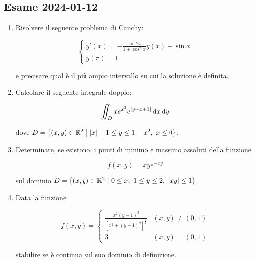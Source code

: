 \subsection{Esame 2024{-}01{-}12}

\begin{enumerate}
    \itemsep32pt
    \item Risolvere il seguente problema di Cauchy:

          \begin{equation*}
              \begin{cases}
                  y'(x) = -\frac{\sin{2x}}{1+\cos^{2}{x}}y(x) + \sin{x} \\
                  y(\pi) = 1
              \end{cases}
          \end{equation*}

          e precisare qual è il più ampio intervallo su cui la soluzione è definita.

    \item Calcolare il seguente integrale doppio:

          \[
              \iint_{D} xe^{x^2}e^{|y+x+1|} \mathop{}\!\mathrm{d}{x}\mathop{}\!\mathrm{d}{y}
          \]

          dove \(D = \{(x,y) \in \mathbb{R}^{2} \;\big|\; |x| - 1 \le y \le 1 - x^2,\ x \le 0\} \).

    \item Determinare, se esistono, i punti di minimo e massimo assoluti della funzione

          \[
              f(x,y) = xye^{-xy}
          \]

          sul dominio \(D = \{(x,y) \in \mathbb{R}^{2} \;\big|\; 0 \le x,\ 1 \le y \le 2,\ |xy| \le 1 \} \).

    \item Data la funzione

          \begin{equation*}
              f(x,y) =
              \begin{cases}
                  \frac{x^2{(y-1)}^3}{{\left[x^2+{(y-1)}^2\right]}^{\frac{5}{2}}} & (x,y) \neq (0,1) \\[4mm]
                  3                                                               & (x,y) = (0,1)
              \end{cases}
          \end{equation*}

          stabilire se è continua sul suo dominio di definizione.

\end{enumerate}
